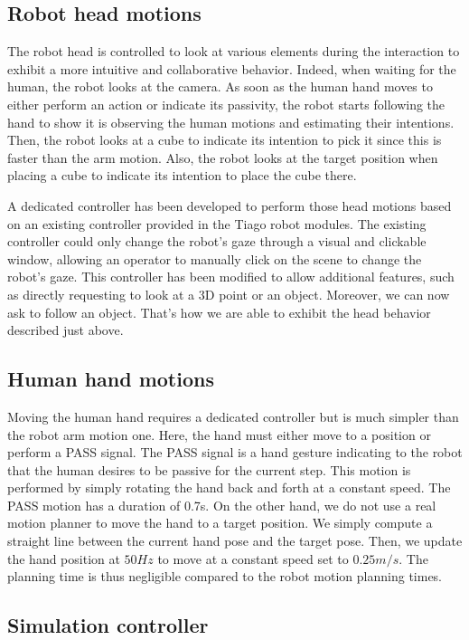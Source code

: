 \subsection{Robot head motions}

The robot head is controlled to look at various elements during the interaction to exhibit a more intuitive and collaborative behavior. 
Indeed, when waiting for the human, the robot looks at the camera. As soon as the human hand moves to either perform an action or indicate its passivity, the robot starts following the hand to show it is observing the human motions and estimating their intentions.
Then, the robot looks at a cube to indicate its intention to pick it since this is faster than the arm motion. 
Also, the robot looks at the target position when placing a cube to indicate its intention to place the cube there.

A dedicated controller has been developed to perform those head motions based on an existing controller provided in the Tiago robot modules. The existing controller could only change the robot's gaze through a visual and clickable window, allowing an operator to manually click on the scene to change the robot's gaze. This controller has been modified to allow additional features, such as directly requesting to look at a 3D point or an object. Moreover, we can now ask to follow an object. That's how we are able to exhibit the head behavior described just above.  

\subsection{Human hand motions}

Moving the human hand requires a dedicated controller but is much simpler than the robot arm motion one. Here, the hand must either move to a position or perform a PASS signal. The PASS signal is a hand gesture indicating to the robot that the human desires to be passive for the current step. This motion is performed by simply rotating the hand back and forth at a constant speed. The PASS motion has a duration of 0.7s. 
On the other hand, we do not use a real motion planner to move the hand to a target position. We simply compute a straight line between the current hand pose and the target pose. Then, we update the hand position at $50Hz$ to move at a constant speed set to $0.25 m/s$. The planning time is thus negligible compared to the robot motion planning times.

\subsection{Simulation controller}

